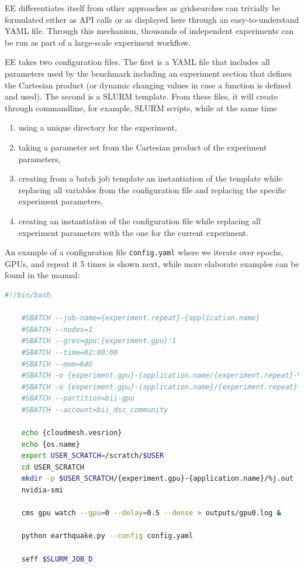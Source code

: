 \documentclass[sigconf]{acmart}
\begin{document}
EE differentiates itself from other approaches as gridsearches can trivially be formulated either as API calls or as displayed here through an easy-to-understand YAML file. Through this mechanism, thousands of independent experiments can be run as part of a large-scale experiment workflow.

EE takes two configuration files. The first is a YAML file that includes all parameters used by the benchmark including an experiment section that defines the Cartesian product (or dynamic changing values in case a function is defined and used). The second is a SLURM template. From these files, it will create through commandline, for example, SLURM scripts, while at the same time 

\begin{enumerate}
  \item using a unique directory for the experiment,
  \item taking a parameter set from the Cartesian product of the experiment parameters,
  \item creating from a batch job template an instantiation of the template while replacing all variables from the configuration file and replacing the specific experiment parameters,
  \item creating an instantiation of the configuration file while replacing all experiment parameters with the one for the current experiment.
\end{enumerate}

An example of a configuration file \verb|config.yaml| where we iterate over epochs, GPUs, and repeat it 5 times is shown next, while more elaborate examples can be found in the manual:

\begin{lstlisting}[language=sh,basicstyle=\small]
    #!/bin/bash

    #SBATCH --job-name={experiment.repeat}-{application.name}
    #SBATCH --nodes=1
    #SBATCH --gres=gpu:{experiment.gpu}:1
    #SBATCH --time=02:00:00
    #SBATCH --mem=64G
    #SBATCH -o {experiment.gpu}-{application.name/{experiment.repeat}-%j.out
    #SBATCH -o {experiment.gpu}-{application.name}/{experiment.repeat}-%j.err
    #SBATCH --partition=bii-gpu
    #SBATCH --account=bii_dsc_community

    echo {cloudmesh.vesrion}
    echo {os.name}
    export USER_SCRATCH=/scratch/$USER
    cd USER_SCRATCH
    mkdir -p $USER_SCRATCH/{experiment.gpu}-{application.name}/%j.out
    nvidia-smi

    cms gpu watch --gpu=0 --delay=0.5 --dense > outputs/gpu0.log &

    python earthquake.py --config config.yaml

    seff $SLURM_JOB_D
\end{lstlisting}
\end{document}
